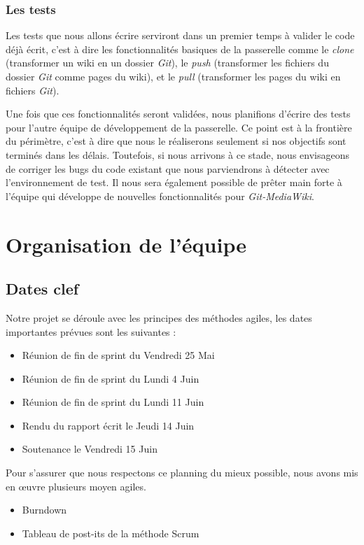 \documentclass[11pt]{article}
\begin{document}
\subsubsection{Les tests}
Les tests que nous allons écrire serviront dans un premier temps à valider le code déjà écrit, c'est à dire les fonctionnalités basiques de la passerelle comme le \textit{clone} (transformer un wiki en un dossier \textit{Git}), le \textit{push} (transformer les fichiers du dossier \textit{Git} comme pages du wiki), et le \textit{pull} (transformer les pages du wiki en fichiers \textit{Git}).

Une fois que ces fonctionnalités seront validées, nous planifions d'écrire des tests pour l'autre équipe de développement de la passerelle. Ce point est à la frontière du périmètre, c'est à dire que nous le réaliserons seulement si nos objectifs sont terminés dans les délais. Toutefois, si nous arrivons à ce stade, nous envisageons de corriger les bugs du code existant que nous parviendrons à détecter avec l'environnement de test. Il nous sera également possible de prêter main forte à l'équipe qui développe de nouvelles fonctionnalités pour \textit{Git-MediaWiki}.

\section{Organisation de l'équipe}
\subsection{Dates clef}
Notre projet se déroule avec les principes des méthodes agiles, les dates importantes prévues sont les suivantes :

\begin{itemize}
\item Réunion de fin de sprint du Vendredi 25 Mai
\item Réunion de fin de sprint du Lundi 4 Juin
\item Réunion de fin de sprint du Lundi 11 Juin
\item Rendu du rapport écrit le Jeudi 14 Juin
\item Soutenance le Vendredi 15 Juin
\end{itemize}

Pour s'assurer que nous respectons ce planning du mieux possible, nous avons mis en œuvre plusieurs moyen agiles.\\
\begin{itemize}
\item Burndown
\item Tableau de post-its de la méthode Scrum
\end{itemize}
\end{document}

